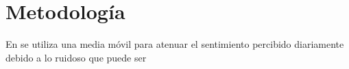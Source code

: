 \chapter{Metodología}

En \cite{o2010tweets} se utiliza una media móvil para atenuar el sentimiento percibido diariamente debido a lo ruidoso que puede ser 